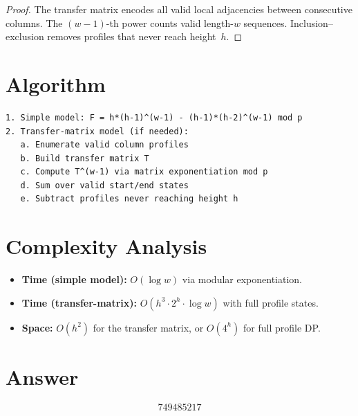 \documentclass[12pt]{article}
\begin{document}
\begin{proof}
The transfer matrix encodes all valid local adjacencies between consecutive columns. The $(w-1)$-th power counts valid length-$w$ sequences. Inclusion--exclusion removes profiles that never reach height~$h$.
\end{proof}

\section{Algorithm}
\begin{verbatim}
1. Simple model: F = h*(h-1)^(w-1) - (h-1)*(h-2)^(w-1) mod p
2. Transfer-matrix model (if needed):
   a. Enumerate valid column profiles
   b. Build transfer matrix T
   c. Compute T^(w-1) via matrix exponentiation mod p
   d. Sum over valid start/end states
   e. Subtract profiles never reaching height h
\end{verbatim}

\section{Complexity Analysis}
\begin{itemize}
    \item \textbf{Time (simple model):} $O(\log w)$ via modular exponentiation.
    \item \textbf{Time (transfer-matrix):} $O(h^3 \cdot 2^h \cdot \log w)$ with full profile states.
    \item \textbf{Space:} $O(h^2)$ for the transfer matrix, or $O(4^h)$ for full profile DP.
\end{itemize}

\section{Answer}

\[
\boxed{749485217}
\]
\end{document}
